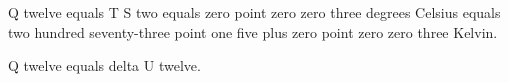 Q twelve equals T S two equals zero point zero zero three degrees Celsius equals two hundred seventy-three point one five plus zero point zero zero three Kelvin.  

Q twelve equals delta U twelve.